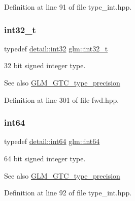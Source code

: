 Definition at line 91 of file type\+\_\+int.\+hpp.

\mbox{\label{group__gtc__type__precision_gab870c0eb6f525b0c8c4716762e0fc3a8}} 
\subsubsection{\texorpdfstring{int32\+\_\+t}{int32\_t}}
{\footnotesize\ttfamily typedef \hyperlink{namespaceglm_1_1detail_a9f85b4efeca416cdcec2fd08939a2e17}{detail\+::int32} \hyperlink{group__gtc__type__precision_gab870c0eb6f525b0c8c4716762e0fc3a8}{glm\+::int32\+\_\+t}}

32 bit signed integer type. \begin{DoxySeeAlso}{See also}
\hyperlink{group__gtc__type__precision}{G\+L\+M\+\_\+\+G\+T\+C\+\_\+type\+\_\+precision} 
\end{DoxySeeAlso}


Definition at line 301 of file fwd.\+hpp.

\mbox{\label{group__gtc__type__precision_ga435d75819cce297cc5fa21bd84ef89a5}} 
\subsubsection{\texorpdfstring{int64}{int64}}
{\footnotesize\ttfamily typedef \hyperlink{namespaceglm_1_1detail_a5b1c3227ec636c24a0676746381adfc8}{detail\+::int64} \hyperlink{group__gtc__type__precision_ga435d75819cce297cc5fa21bd84ef89a5}{glm\+::int64}}

64 bit signed integer type. \begin{DoxySeeAlso}{See also}
\hyperlink{group__gtc__type__precision}{G\+L\+M\+\_\+\+G\+T\+C\+\_\+type\+\_\+precision} 
\end{DoxySeeAlso}


Definition at line 92 of file type\+\_\+int.\+hpp.

\mbox{\label{group__gtc__type__precision_ga6abb23fbf4e39c50ec5341160b5da5ab}} 
